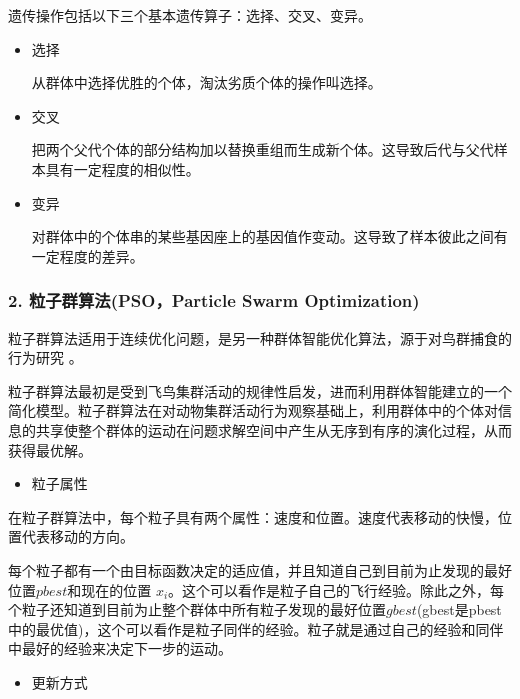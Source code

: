 \documentclass[a4paper,10pt,english]{sphinxmanual}
\begin{document}
\sphinxAtStartPar
遗传操作包括以下三个基本遗传算子：选择、交叉、变异。
\begin{itemize}
\item {} 
\sphinxAtStartPar
选择

\sphinxAtStartPar
从群体中选择优胜的个体，淘汰劣质个体的操作叫选择。

\item {} 
\sphinxAtStartPar
交叉

\sphinxAtStartPar
把两个父代个体的部分结构加以替换重组而生成新个体。这导致后代与父代样本具有一定程度的相似性。

\item {} 
\sphinxAtStartPar
变异

\sphinxAtStartPar
对群体中的个体串的某些基因座上的基因值作变动。这导致了样本彼此之间有一定程度的差异。

\end{itemize}


\subsubsection{2. 粒子群算法(PSO，Particle Swarm Optimization)}
\label{\detokenize{_u7b80_u4ecb/_u6838_u5fc3_u8bbe_u8ba1_u4f18_u5316_u7b97_u6cd5/_u5168_u5c40_u641c_u7d22_u4f18_u5316_u6a21_u5757/_u5168_u5c40_u4f18_u5316_u7b97_u6cd5:pso-particle-swarm-optimization}}
\sphinxAtStartPar
粒子群算法适用于连续优化问题，是另一种群体智能优化算法，源于对鸟群捕食的行为研究 。

\sphinxAtStartPar
粒子群算法最初是受到飞鸟集群活动的规律性启发，进而利用群体智能建立的一个简化模型。粒子群算法在对动物集群活动行为观察基础上，利用群体中的个体对信息的共享使整个群体的运动在问题求解空间中产生从无序到有序的演化过程，从而获得最优解。
\begin{itemize}
\item {} 
\sphinxAtStartPar
粒子属性

\end{itemize}

\sphinxAtStartPar
在粒子群算法中，每个粒子具有两个属性：速度和位置。速度代表移动的快慢，位置代表移动的方向。

\sphinxAtStartPar
每个粒子都有一个由目标函数决定的适应值，并且知道自己到目前为止发现的最好位置\(pbest\)和现在的位置 \(x_i\)。这个可以看作是粒子自己的飞行经验。除此之外，每个粒子还知道到目前为止整个群体中所有粒子发现的最好位置\(gbest\)(gbest是pbest中的最优值)，这个可以看作是粒子同伴的经验。粒子就是通过自己的经验和同伴中最好的经验来决定下一步的运动。
\begin{itemize}
\item {} 
\sphinxAtStartPar
更新方式

\end{itemize}
\end{document}
